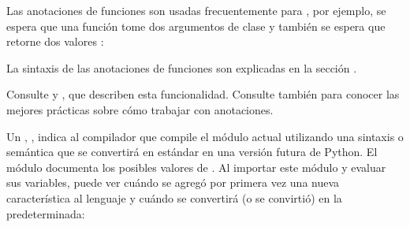 \documentclass[a4,10pt,spanish]{sphinxmanual}
\begin{document}
\begin{description}
\sphinxAtStartPar
Las anotaciones de funciones son usadas frecuentemente para {\hyperref[\detokenize{glossary:term-type-hint}]{}}, por ejemplo, se espera que una función tome dos argumentos de clase   y también se espera que retorne dos valores :

\begin{sphinxVerbatim}[commandchars=\\\{\}]
      
      
\end{sphinxVerbatim}

\sphinxAtStartPar
La sintaxis de las anotaciones de funciones son explicadas en la sección .

\sphinxAtStartPar
Consulte {\hyperref[\detokenize{glossary:term-variable-annotation}]{}} y , que describen esta funcionalidad. Consulte también  para conocer las mejores prácticas sobre cómo trabajar con anotaciones.

\item[{\_\_future\_\_\index{\_\_future\_\_@\spxentry{\_\_future\_\_}|spxpagem}\phantomsection\label{\detokenize{glossary:term-__future__}}}] \leavevmode
\sphinxAtStartPar
Un , , indica al compilador que compile el módulo actual utilizando una sintaxis o semántica que se convertirá en estándar en una versión futura de Python. El módulo  documenta los posibles valores de . Al importar este módulo y evaluar sus variables, puede ver cuándo se agregó por primera vez una nueva característica al lenguaje y cuándo se convertirá (o se convirtió) en la predeterminada:

\begin{sphinxVerbatim}[commandchars=\\\{\}]
 
\end{sphinxVerbatim}


\end{description}
\end{document}
